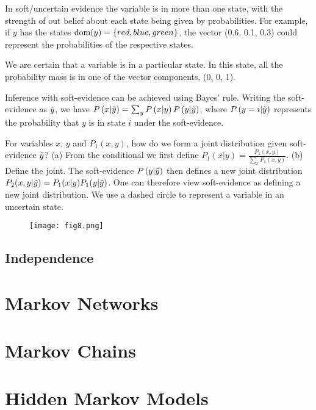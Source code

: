 \begin{description}[leftmargin=0cm]	
	\item[Definition] In soft/uncertain evidence the variable is in more than one state, with the strength of out belief about each state being given by probabilities. For example, if $y$ has the states $\textrm{dom}(y)=\{red,blue,green\}$, the vector (0.6, 0.1, 0.3) could represent the probabilities of the respective states.
	\item[Hard Evidence] We are certain that a variable is in a particular state. In this state, all the probability mass is in one of the vector components, (0, 0, 1).
	\item[Inference] Inference with soft-evidence can be achieved using Bayes' rule. Writing the soft-evidence as $\tilde{y}$, we have $P\left(x|\tilde{y}\right)=\sum_yP\left(x|y\right)P\left(y|\tilde{y}\right)$, where $P\left(y=i|\tilde{y}\right)$ represents the probability that $y$ is in state $i$ under the soft-evidence.
	\item[Jeffrey's Rule] For variables $x$, $y$ and $P_1(x,y)$, how do we form a joint distribution given soft-evidence $\tilde{y}$? (a) From the conditional we first define $P_1(x|y)=\frac{P_1(x,y)}{\sum_xP_1(x,y)}$. (b) Define the joint. The soft-evidence $P\left(y|\tilde{y}\right)$ then defines a new joint distribution $P_2(x,y|\tilde{y})=P_1(x|y)P_1(y|\tilde{y})$. One can therefore view soft-evidence as defining a new joint distribution. We use a dashed circle to represent a variable in an uncertain state.
		\begin{figure*}[h]
			\centering
			\texttt{[image: fig8.png]}
		\end{figure*}
\end{description}

\subsection{Independence}

\section{Markov Networks}

\section{Markov Chains}

\section{Hidden Markov Models}